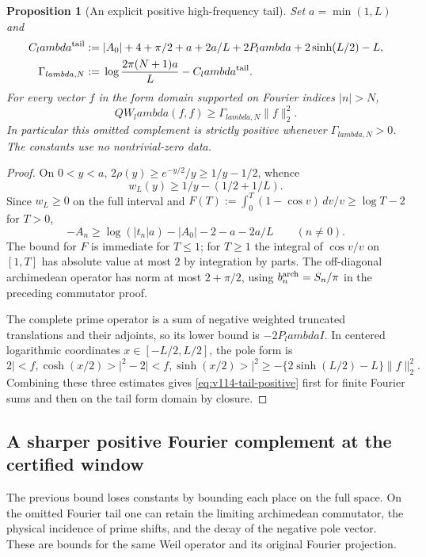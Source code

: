 \documentclass[11pt]{article}
\def\lambda{lambda}%
\def\ip#1#2{<#1,#2>}%
\newtheorem{proposition}[theorem]{Proposition}
\theoremstyle{remark}
\newcommand{\ip}[2]{\left\langle #1,#2\right\rangle}
\begin{document}
\begin{proposition}[An explicit positive high-frequency tail]
\label{prop:v114-weil-tail}
Set $a=\min(1,L)$ and
\begin{align}
 C_\lambda^{\rm tail}
 :={}&|A_0|+4+\pi/2+a+2a/L+2P_\lambda
                   +2\sinh(L/2)-L,\notag\\
 \Gamma_{\lambda,N}
 :={}&\log\frac{2\pi(N+1)a}{L}-C_\lambda^{\rm tail}.
 \label{eq:v114-tail-constant}
\end{align}
For every vector $f$ in the form domain supported on Fourier indices
$|n|>N$,
\begin{equation}\label{eq:v114-tail-positive}
 QW_\lambda(f,f)\ge\Gamma_{\lambda,N}\|f\|_2^2.
\end{equation}
In particular this omitted complement is strictly positive whenever
$\Gamma_{\lambda,N}>0$. The constants use no nontrivial-zero data.
\end{proposition}
\begin{proof}
On $0<y<a$, $2\rho(y)\ge e^{-y/2}/y\ge1/y-1/2$, whence
\[
 w_L(y)\ge1/y-(1/2+1/L).
\]
Since $w_L\ge0$ on the full interval and
$F(T):=\int_0^T(1-\cos v)\,dv/v\ge\log T-2$ for $T>0$,
\[
 -A_n\ge\log(|t_n|a)-|A_0|-2-a-2a/L\qquad(n\ne0).
\]
The bound for $F$ is immediate for $T\le1$; for $T\ge1$ the
integral of $\cos v/v$ on $[1,T]$ has absolute value at most $2$
by integration by parts. The off-diagonal archimedean operator has
norm at most $2+\pi/2$, using $b_n^{\rm arch}=S_n/\pi$ in the
preceding commutator proof.

The complete prime operator is a sum of negative weighted truncated
translations and their adjoints, so its lower bound is $-2P_\lambda I$.
In centered logarithmic coordinates $x\in[-L/2,L/2]$, the pole form is
\[
 2|\ip f{\cosh(x/2)}|^2-2|\ip f{\sinh(x/2)}|^2
 \ge-\{2\sinh(L/2)-L\}\|f\|_2^2.
\]
Combining these three estimates gives
\eqref{eq:v114-tail-positive} first for finite Fourier sums and then
on the tail form domain by closure.
\end{proof}

\subsection{A sharper positive Fourier complement at the certified window}
The previous bound loses constants by bounding each place on the full
space. On the omitted Fourier tail one can retain the limiting
archimedean commutator, the physical incidence of prime shifts, and the
decay of the negative pole vector. These are bounds for the same Weil
operator and its original Fourier projection.
\end{document}

